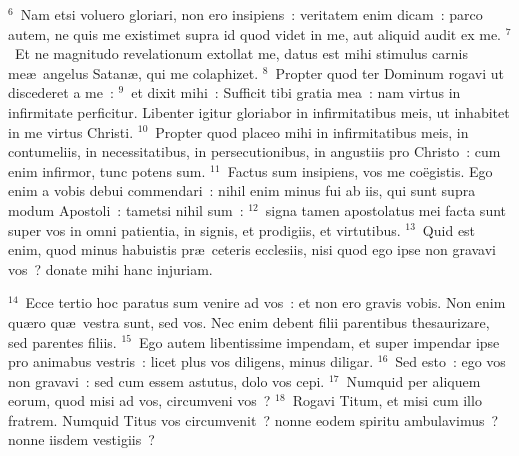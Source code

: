 ${}^{6}$~Nam etsi voluero gloriari, non ero insipiens~: veritatem enim dicam~: parco autem, ne quis me existimet supra id quod videt in me, aut aliquid audit ex me.
${}^{7}$~Et ne magnitudo revelationum extollat me, datus est mihi stimulus carnis me\ae\ angelus Satan\ae , qui me colaphizet.
${}^{8}$~Propter quod ter Dominum rogavi ut discederet a me~:
${}^{9}$~et dixit mihi~: Sufficit tibi gratia mea~: nam virtus in infirmitate perficitur. Libenter igitur gloriabor in infirmitatibus meis, ut inhabitet in me virtus Christi.
${}^{10}$~Propter quod placeo mihi in infirmitatibus meis, in contumeliis, in necessitatibus, in persecutionibus, in angustiis pro Christo~: cum enim infirmor, tunc potens sum.
${}^{11}$~Factus sum insipiens, vos me co\"egistis. Ego enim a vobis debui commendari~: nihil enim minus fui ab iis, qui sunt supra modum Apostoli~: tametsi nihil sum~:
${}^{12}$~signa tamen apostolatus mei facta sunt super vos in omni patientia, in signis, et prodigiis, et virtutibus.
${}^{13}$~Quid est enim, quod minus habuistis pr\ae\ ceteris ecclesiis, nisi quod ego ipse non gravavi vos~? donate mihi hanc injuriam.


${}^{14}$~Ecce tertio hoc paratus sum venire ad vos~: et non ero gravis vobis. Non enim qu\ae ro qu\ae\ vestra sunt, sed vos. Nec enim debent filii parentibus thesaurizare, sed parentes filiis.
${}^{15}$~Ego autem libentissime impendam, et super impendar ipse pro animabus vestris~: licet plus vos diligens, minus diligar.
${}^{16}$~Sed esto~: ego vos non gravavi~: sed cum essem astutus, dolo vos cepi.
${}^{17}$~Numquid per aliquem eorum, quod misi ad vos, circumveni vos~?
${}^{18}$~Rogavi Titum, et misi cum illo fratrem. Numquid Titus vos circumvenit~? nonne eodem spiritu ambulavimus~? nonne iisdem vestigiis~?


